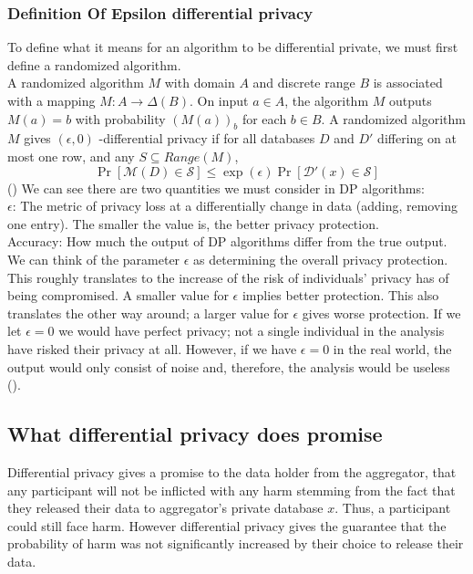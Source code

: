 \documentclass[11pt]{article}
\theoremstyle{definition}
\begin{document}
\subsubsection{Definition Of Epsilon differential privacy}
To define what it means for an algorithm to be differential private, we must first define a randomized algorithm.\\ A randomized algorithm $M$ with domain $A$ and discrete range $B$ is associated with a mapping $M:A\rightarrow\Delta(B)$. On input $a\in A$, the algorithm $M$ outputs $M(a) =b$ with probability $(M(a))_b$ for each $b\in B$.
A randomized algorithm $M$ gives $(\epsilon,0)$ -differential privacy if for all databases $D$ and $D'$ differing on at most one row, and any $S \subseteq Range(M)$,
\[
\operatorname{Pr}[\mathcal{M}(D) \in \mathcal{S}] \leq \exp (\epsilon) \operatorname{Pr}[\mathcal{D'}(x) \in \mathcal{S}]
\] (\cite[17]{algo_fun})
We can see there are two quantities we must consider in DP algorithms: \\ $\epsilon$: The metric of privacy loss at a differentially change in data (adding, removing one entry). The smaller the value is, the better privacy protection. \\ Accuracy: How much the output of DP algorithms differ from the true output.
We can think of the parameter $\epsilon$ as determining the overall privacy protection. This roughly translates to the increase of the risk of individuals' privacy has of being compromised. A smaller value for $\epsilon$ implies better protection. This also translates the other way around; a larger value for $\epsilon$ gives worse protection. If we let $\epsilon = 0$ we would have perfect privacy; not a single individual in the analysis have risked their privacy at all. However, if we have $\epsilon = 0$ in the real world, the output would only consist of noise and, therefore, the analysis would be useless (\cite[23]{havard}).

\subsection{What differential privacy does promise}
Differential privacy gives a promise to the data holder from the aggregator, that any participant will not be inflicted with any harm stemming from the fact that they released their data to aggregator's private database $x$. Thus, a participant could still face harm. However differential privacy gives the guarantee that the probability of harm was not significantly increased by their choice to release their data. 
\end{document}
